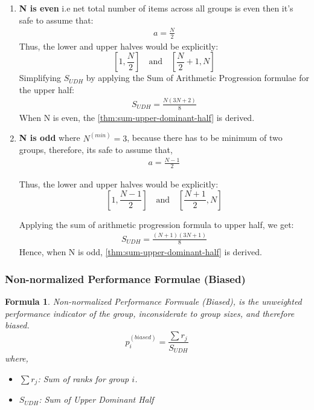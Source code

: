 \documentclass[a4paper,fleqn,review]{cas-sc}
\newtheorem{theorem}{Formula}
\begin{document}
\begin{enumerate} 
	\item \textbf{N is even} i.e net total number of items across all groups is even then it's safe to assume that:
	\begin{align*}
		a = \frac{N}{2}
	\end{align*}
	Thus, the lower and upper halves would be explicitly:
	\[
	\left[1, \frac{N}{2}\right] \quad \text{and} \quad \left[\frac{N}{2}+1, N\right]
	\]
	Simplifying $S_{UDH}$ by applying the Sum of Arithmetic Progression formulae for the upper half:
	\begin{align*}
		S_{UDH} = \frac{N(3N + 2)}{8}
	\end{align*}
	When N is even, the \autoref{thm:sum-upper-dominant-half} is derived.
	
	\item \textbf{N is odd} where $N^{(min)} = 3$, because there has to be minimum of two groups, therefore,  its safe to assume that,
	\begin{align*}
		a = \frac{N-1}{2}
	\end{align*}
	
	Thus, the lower and upper halves would be explicitly:
	\[
	\left[1, \frac{N-1}{2}\right] \quad \text{and} \quad \left[\frac{N+1}{2}, N\right]
	\]
	
	Applying the sum of arithmetic progression formula to upper half, we get:
	\begin{align*}
		S_{UDH} = \frac{(N+1)(3N+1)}{8}
	\end{align*}
	Hence, when N is odd, \autoref{thm:sum-upper-dominant-half} is derived.
\end{enumerate}

\subsubsection{Non-normalized Performance Formulae (Biased)}


\begin{theorem}\label{thm:non-normalized-biased-performance-measure}
	Non-normalized Performance Formuale (Biased), is the unweighted performance indicator of the group, inconsiderate to group sizes, and therefore biased.
\begin{equation}
    p_i^{(biased)} = \frac{\sum r_j}{ S_{UDH} }
 \label{eq:p-biased}
\end{equation}
where,
\begin{itemize}
    \item[] \textbf{$\sum r_j$}: Sum of ranks for group $i$.
    \item[] \textbf{$S_{UDH}$}: Sum of Upper Dominant Half
\end{itemize}
\end{theorem}
\end{document}
